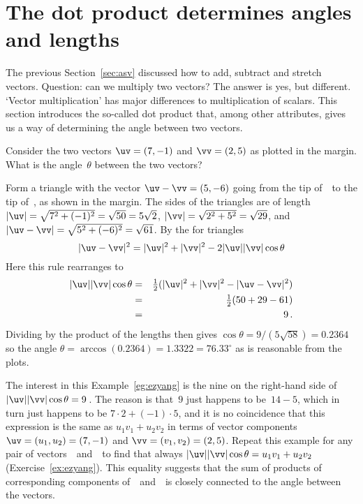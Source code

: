 
\section{The dot product determines angles and lengths}
\label{sec:dpdal}
\secttoc

The previous Section~\ref{sec:asv} discussed how to add, subtract and stretch vectors.
Question: can we multiply two vectors?
The answer is yes, but different. 
`Vector multiplication' has major differences to multiplication of scalars.
This section introduces the so-called dot product that, among other attributes, gives us a way of determining the angle between two vectors.

\begin{example} \label{eg:ezyang}
Consider the two vectors \(\uv=(7,-1)\) and \(\vv=(2,5)\) as plotted in the margin.
What is the angle~\(\theta\) between the two vectors?
\def\vecopsHook{\node[above] at (axis cs:0,0) {$\qquad\theta$};}
\begin{solution} 
Form a triangle with the vector \(\uv-\vv=(5,-6)\) going from the tip of~\vv\ to the tip of~\uv, as shown in the margin.
The sides of the triangles are of length \(|\uv|=\sqrt{7^2+(-1)^2}=\sqrt{50}=5\sqrt2\), \(|\vv|=\sqrt{2^2+5^2}=\sqrt{29}\), and \(|\uv-\vv|=\sqrt{5^2+(-6)^2}=\sqrt{61}\).
By the  for triangles
\begin{equation*}
|\uv-\vv|^2=|\uv|^2+|\vv|^2-2|\uv||\vv|\cos\theta
\end{equation*}
%
Here this rule rearranges to
\begin{eqnarray*}
|\uv||\vv|\cos\theta
&=&\tfrac12(|\uv|^2+|\vv|^2-|\uv-\vv|^2)
\\&=&\tfrac12(50+29-61)
\\&=&9\,.
\end{eqnarray*}
Dividing by the product of the lengths then gives \(\cos\theta=9/(5\sqrt{58})=0.2364\) so the angle \(\theta =\arccos(0.2364) =1.3322 =76.33^\circ\) as is reasonable from the plots.
\end{solution}
\end{example}

The interest in this Example~\ref{eg:ezyang} is the nine on the right-hand side of \(|\uv||\vv|\cos\theta=9\)\,.  
The reason is that~\(9\) just happens to be~\(14-5\), which in turn just happens to be \(7\cdot2+(-1)\cdot5\), and it is no coincidence that this expression is the same as \(u_1v_1+u_2v_2\) in terms of vector components \(\uv=(u_1,u_2)=(7,-1)\) and \(\vv=(v_1,v_2)=(2,5)\).
Repeat this example for any pair of vectors~\uv\ and~\vv\ to find that always \(|\uv||\vv|\cos\theta=u_1v_1+u_2v_2\) (Exercise~\ref{ex:ezyang}).
This equality suggests that the sum of products of corresponding components of~\uv\ and~\vv\ is closely connected to the angle between the vectors.


